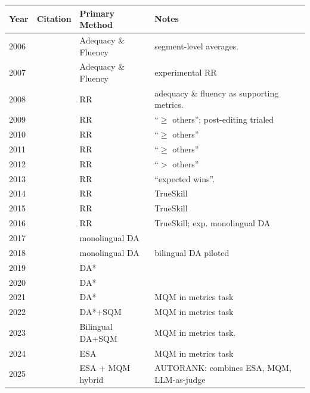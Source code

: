 \begin{table}[b]
\centering

\small
\begin{tabular}{@{}l l p{2.8cm} p{4.5cm}@{}}
\toprule
\textbf{Year} & \textbf{Citation} & \textbf{Primary Method} & \textbf{Notes} \\
\midrule

2006 & \cite{koehn-monz:2006:WMT} & Adequacy \& Fluency  &  segment-level averages. \\
2007 & \cite{ws-2007-statistical} & Adequacy \& Fluency & experimental RR \\
2008 & \cite{wmt2008} &  RR &  adequacy \& fluency as supporting metrics. \\
2009 & \cite{callison-burch-etal-2009-findings} & RR  & ``$\geq$ others''; post-editing trialed \\
2010 & \cite{wmt10} & RR & ``$\geq$ others'' \\

\midrule
2011 & \cite{wmt11} & RR  & ``$\geq$ others'' \\
2012 & \cite{wmt12} & RR & ``$>$ others''  \\
2013 & \cite{wmt13} & RR & ``expected wins''. \\
2014 & \cite{wmt14} & RR & TrueSkill \\
2015 & \cite{wmt15} & RR & TrueSkill \\
2016 & \cite{wmt16} & RR & TrueSkill;  exp. monolingual DA \\

\midrule
2017 & \cite{wmt17} & monolingual DA \\
2018 & \cite{bojar-etal-2018-findings} & monolingual DA  & bilingual DA piloted \\
2019 & \cite{barrault-etal-2019-findings} & DA*  & \\
2020 & \cite{barrault-etal-2020-findings} & DA*  & \\
2021 & \cite{akhbardeh-etal-2021-findings} & DA*  &  MQM in metrics task \\

\midrule
2022 & \cite{kocmi-etal-2022-findings} & DA*+SQM & MQM in metrics task\\
2023 & \cite{kocmi-etal-2023-findings} & Bilingual DA+SQM &  MQM in metrics task. \\
2024 & \cite{kocmi-etal-2024-findings} & ESA &  MQM in metrics task\\ 
2025 & \cite{kocmi-etal-2025-findings} & ESA + MQM hybrid & AUTORANK: combines ESA, MQM, LLM-as-judge \\


\end{tabular}
\end{table}
